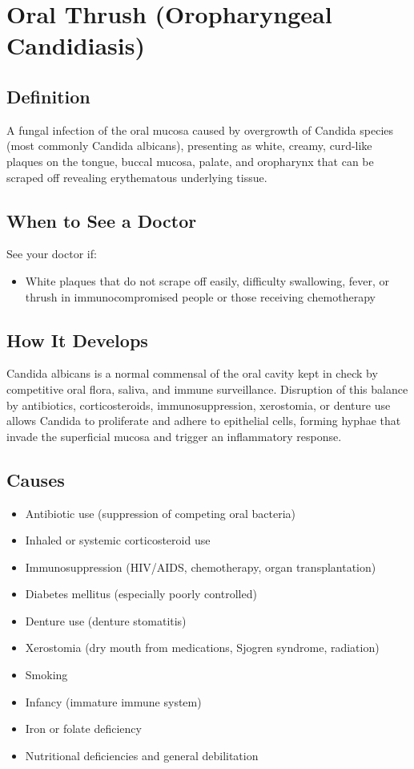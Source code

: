 \chapter{Oral Thrush (Oropharyngeal Candidiasis)}

\section*{Definition}
A fungal infection of the oral mucosa caused by overgrowth of Candida species (most commonly Candida albicans), presenting as white, creamy, curd-like plaques on the tongue, buccal mucosa, palate, and oropharynx that can be scraped off revealing erythematous underlying tissue.

\section*{When to See a Doctor}
See your doctor if:
\begin{itemize}
  \item White plaques that do not scrape off easily, difficulty swallowing, fever, or thrush in immunocompromised people or those receiving chemotherapy
\end{itemize}

\section*{How It Develops}
Candida albicans is a normal commensal of the oral cavity kept in check by competitive oral flora, saliva, and immune surveillance. Disruption of this balance by antibiotics, corticosteroids, immunosuppression, xerostomia, or denture use allows Candida to proliferate and adhere to epithelial cells, forming hyphae that invade the superficial mucosa and trigger an inflammatory response.

\section*{Causes}
\begin{itemize}
  \item Antibiotic use (suppression of competing oral bacteria)
  \item Inhaled or systemic corticosteroid use
  \item Immunosuppression (HIV/AIDS, chemotherapy, organ transplantation)
  \item Diabetes mellitus (especially poorly controlled)
  \item Denture use (denture stomatitis)
  \item Xerostomia (dry mouth from medications, Sjogren syndrome, radiation)
  \item Smoking
  \item Infancy (immature immune system)
  \item Iron or folate deficiency
  \item Nutritional deficiencies and general debilitation
\end{itemize}

